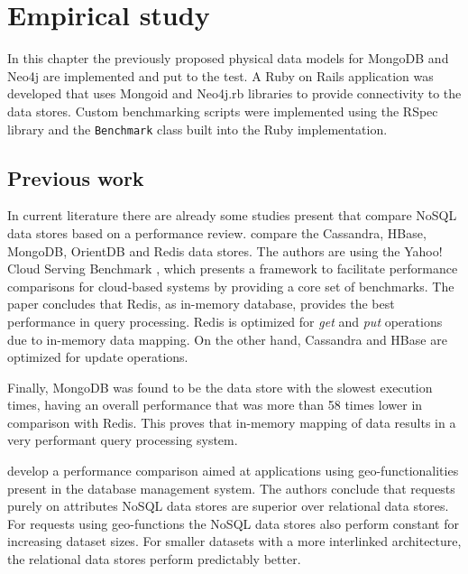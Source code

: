 \chapter{Empirical study}
\label{ch:empirical-study}

In this chapter the previously proposed physical data models for MongoDB and Neo4j are implemented and put to the test.
A Ruby on Rails application was developed that uses Mongoid and Neo4j.rb libraries to provide connectivity to the data stores.
Custom benchmarking scripts were implemented using the RSpec library \autocite{RSpec2005} and the \texttt{Benchmark} class built into the Ruby implementation.

\section{Previous work}
\label{sec:previous-work}


In current literature there are already some studies present that compare NoSQL data stores based on a performance review.
\textcite{Abramova2014} compare the Cassandra, HBase, MongoDB, OrientDB and Redis data stores.
The authors are using the Yahoo! Cloud Serving Benchmark \autocite{Cooper2010}, which presents a framework to facilitate performance comparisons for cloud-based systems by providing a core set of benchmarks.
The paper concludes that Redis, as in-memory database, provides the best performance in query processing.
Redis is optimized for \textit{get} and \textit{put} operations due to in-memory data mapping.
On the other hand, Cassandra and HBase are optimized for update operations.

Finally, MongoDB was found to be the data store with the slowest execution times, having an overall performance that was more than 58 times lower in comparison with Redis.
This proves that in-memory mapping of data results in a very performant query processing system.

\textcite{Schmid2015} develop a performance comparison aimed at applications using geo-functionalities present in the database management system.
The authors conclude that requests purely on attributes NoSQL data stores are superior over relational data stores.
For requests using geo-functions the NoSQL data stores also perform constant for increasing dataset sizes.
For smaller datasets with a more interlinked architecture, the relational data stores perform predictably better.

